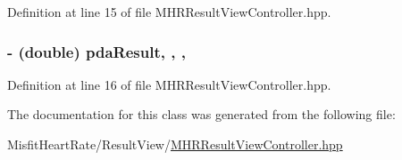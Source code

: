 Definition at line 15 of file M\+H\+R\+Result\+View\+Controller.\+hpp.

\hypertarget{interface_m_h_r_result_view_controller_ae0daab10c086e438477f71f59fa0de37}{
\subsubsection[{pda\+Result}]{\setlength{\rightskip}{0pt plus 5cm}-\/ (double) pda\+Result\hspace{0.3cm}{\ttfamily [read]}, {\ttfamily [write]}, {\ttfamily [nonatomic]}, {\ttfamily [assign]}}}\label{interface_m_h_r_result_view_controller_ae0daab10c086e438477f71f59fa0de37}


Definition at line 16 of file M\+H\+R\+Result\+View\+Controller.\+hpp.



The documentation for this class was generated from the following file\+:\begin{DoxyCompactItemize}
\item 
Misfit\+Heart\+Rate/\+Result\+View/\hyperlink{_m_h_r_result_view_controller_8hpp}{M\+H\+R\+Result\+View\+Controller.\+hpp}\end{DoxyCompactItemize}

